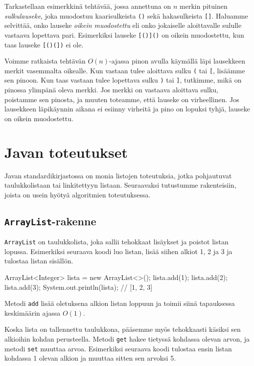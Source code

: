 Tarkastellaan esimerkkinä tehtävää, jossa annettuna on
$n$ merkin pituinen \emph{sulkulauseke}, 
joka muodostuu kaarisulkeista \texttt{()} sekä
hakasulkeista \texttt{[]}.
Haluamme selvittää, onko lauseke \emph{oikein muodostettu} eli
onko jokaiselle aloittavalle sululle vastaava lopettava pari.
Esimerkiksi lauseke \texttt{[()]()} on oikein muodostettu,
kun taas lauseke \texttt{[()(])} ei ole.

Voimme ratkaista tehtävän $O(n)$-ajassa pinon avulla
käymällä läpi lausekkeen merkit vasemmalta oikealle.
Kun vastaan tulee aloittava sulku \texttt{(} tai \texttt{[},
lisäämme sen pinoon.
Kun taas vastaan tulee lopettava sulku \texttt{)} tai \texttt{]},
tutkimme, mikä on pinossa ylimpänä oleva merkki.
Jos merkki on vastaava aloittava sulku,
poistamme sen pinosta, ja muuten toteamme, että lauseke on virheellinen.
Jos lausekkeen läpikäynnin aikana ei esiinny virheitä
ja pino on lopuksi tyhjä, lauseke on oikein muodostettu.

\section{Javan toteutukset}

Javan standardikirjastossa on monia listojen toteutuksia,
jotka pohjautuvat taulukkolistaan tai linkitettyyn listaan.
Seuraavaksi tutustumme rakenteisiin, joista on usein
hyötyä algoritmien toteutuksessa.

\subsection{\texttt{ArrayList}-rakenne}

\texttt{ArrayList} on taulukkolista,
joka sallii tehokkaat lisäykset ja poistot listan lopussa.
Esimerkiksi seuraava koodi luo listan, lisää siihen alkiot
1, 2 ja 3 ja tulostaa listan sisällön.

\begin{code}
ArrayList<Integer> lista = new ArrayList<>();
lista.add(1);
lista.add(2);
lista.add(3);
System.out.println(lista); // [1, 2, 3]
\end{code}

Metodi \texttt{add} lisää oletuksena alkion listan loppuun
ja toimii siinä tapauksessa keskimäärin ajassa $O(1)$.

Koska lista on tallennettu taulukkona,
pääsemme myös tehokkaasti käsiksi sen alkioihin
kohdan perusteella.
Metodi \texttt{get} hakee tietyssä kohdassa olevan arvon,
ja metodi \texttt{set} muuttaa arvoa.
Esimerkiksi seuraava koodi tulostaa ensin
listan kohdassa 1 olevan alkion ja muuttaa sitten
sen arvoksi 5.

